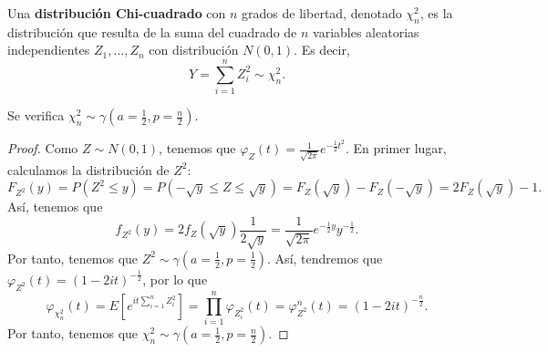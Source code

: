\begin{definition}
Una \textbf{distribución Chi-cuadrado} con $\displaystyle n $ grados de libertad, denotado $\displaystyle \chi^{2}_{n} $, es la distribución que resulta de la suma del cuadrado de $\displaystyle n $ variables aleatorias independientes $\displaystyle Z_{1}, \ldots, Z_{n} $ con distribución $\displaystyle N\left(0,1\right) $. Es decir,
\[Y = \sum^{n}_{i = 1}Z_{i}^{2} \sim \chi^{2}_{n}.\]
\end{definition}
\begin{prop}
Se verifica $\displaystyle \chi_{n}^{2} \sim \gamma\left(a = \frac{1}{2}, p = \frac{n}{2}\right) $. 
\end{prop}
\begin{proof}
Como $\displaystyle Z \sim N\left(0,1\right) $, tenemos que $\displaystyle \varphi_{Z}\left(t\right)=\frac{1}{\sqrt{2\pi }}e^{-\frac{1}{2}t ^{2}} $. En primer lugar, calculamos la distribución de $\displaystyle Z^{2} $:
\[F_{Z^{2}}\left(y\right)=P\left(Z^{2} \leq y\right) = P\left(-\sqrt{y} \leq Z \leq \sqrt{y} \right) = F_{Z}\left(\sqrt{y}\right)-F_{Z}\left(-\sqrt{y}\right) = 2F_{Z}\left(\sqrt{y}\right)-1.\]
Así, tenemos que 
\[f_{Z^{2}}\left(y\right)=2f_{Z}\left(\sqrt{y}\right)\frac{1}{2\sqrt{y}}=\frac{1}{\sqrt{2\pi }}e^{-\frac{1}{2}y}y^{-\frac{1}{2}} .\]
Por tanto, tenemos que $\displaystyle Z^{2} \sim \gamma \left(a = \frac{1}{2}, p = \frac{1}{2}\right) $. Así, tendremos que $\displaystyle \varphi_{Z^{2}}\left(t\right)=\left(1-2it\right)^{-\frac{1}{2}} $, por lo que 
\[\varphi_{\chi_{n}^{2}}\left(t\right)=E\left[e^{it\sum^{n}_{i = 1}Z_{i}^{2}}\right] = \prod^{n}_{i = 1}\varphi_{Z_{i}^{2}}\left(t\right)=\varphi_{Z^{2}}^{n}\left(t\right) = \left(1 - 2it\right)^{-\frac{n}{2}} .\]
Por tanto, tenemos que $\displaystyle \chi_{n}^{2} \sim \gamma\left(a = \frac{1}{2}, p = \frac{n}{2}\right) $. 
\end{proof}
